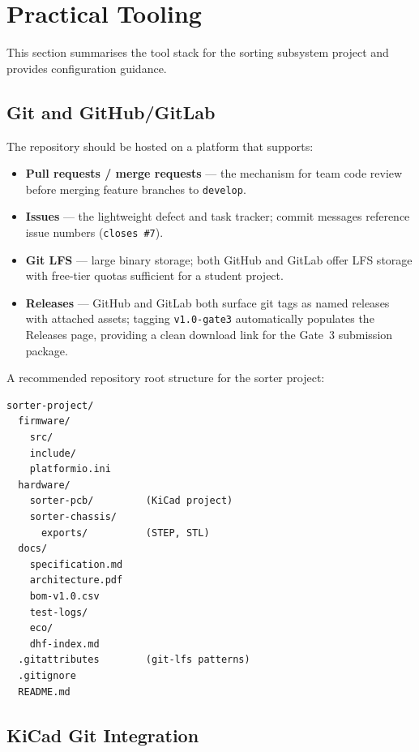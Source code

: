\section{Practical Tooling}
\label{sec:ch13-tooling}

This section summarises the tool stack for the sorting
subsystem project and provides configuration guidance.

\subsection{Git and GitHub/GitLab}
\label{subsec:ch13-git-platforms}

The repository should be hosted on a platform that supports:
\begin{itemize}
  \item \textbf{Pull requests / merge requests} --- the mechanism for team code review
        before merging feature branches to \texttt{develop}.
  \item \textbf{Issues} --- the lightweight defect and task tracker; commit messages
        reference issue numbers (\texttt{closes \#7}).
  \item \textbf{Git LFS} --- large binary storage; both GitHub and GitLab offer LFS
        storage with free-tier quotas sufficient for a student project.
  \item \textbf{Releases} --- GitHub and GitLab both surface git tags as named releases
        with attached assets; tagging \texttt{v1.0-gate3} automatically populates the
        Releases page, providing a clean download link for the Gate~3 submission package.
\end{itemize}

A recommended repository root structure for the sorter project:

\begin{verbatim}
sorter-project/
  firmware/
    src/
    include/
    platformio.ini
  hardware/
    sorter-pcb/         (KiCad project)
    sorter-chassis/
      exports/          (STEP, STL)
  docs/
    specification.md
    architecture.pdf
    bom-v1.0.csv
    test-logs/
    eco/
    dhf-index.md
  .gitattributes        (git-lfs patterns)
  .gitignore
  README.md
\end{verbatim}

\subsection{KiCad Git Integration}
\label{subsec:ch13-kicad-git}

